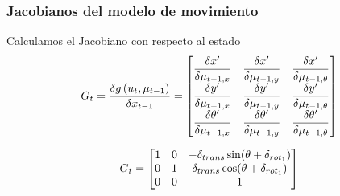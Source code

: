 \begin{frame}
	\frametitle{Jacobianos del modelo de movimiento}
	Calculamos el Jacobiano con respecto al estado
	\begin{equation*}
		G_{t} = \dfrac{\delta g\left( u_{t},\mu_{t-1} \right)}{\delta x_{t-1}} =
		\begin{bmatrix}
			\dfrac{\delta x^{\prime}}{\delta \mu_{t-1,x}} & \dfrac{\delta x^{\prime}}{\delta \mu_{t-1,y}} & \dfrac{\delta x^{\prime}}{\delta \mu_{t-1,\theta}}\\
			\dfrac{\delta y^{\prime}}{\delta \mu_{t-1,x}} & \dfrac{\delta y^{\prime}}{\delta \mu_{t-1,y}} & \dfrac{\delta y^{\prime}}{\delta \mu_{t-1,\theta}}\\
			\dfrac{\delta \theta^{\prime}}{\delta \mu_{t-1,x}} & \dfrac{\delta \theta^{\prime}}{\delta \mu_{t-1,y}} & \dfrac{\delta \theta^{\prime}}{\delta \mu_{t-1,\theta}}\\
		\end{bmatrix}
	\end{equation*}

	\begin{equation*}
	G_{t} = 
	\begin{bmatrix}
		1 & 0 & -\delta_{trans} \sin(\theta + \delta_{rot_{1}})\\
		0 & 1 & \delta_{trans} \cos(\theta + \delta_{rot_{1}})\\
		0 & 0 & 1\\
	\end{bmatrix}
	\end{equation*}
\end{frame}


